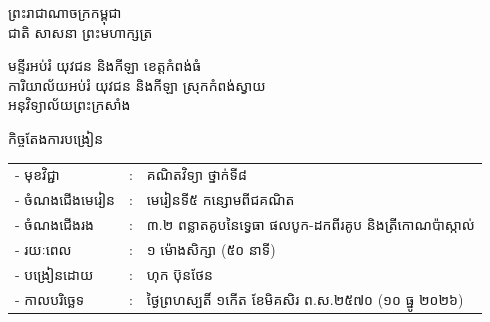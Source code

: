 \documentclass[a4paper,10pt]{article}
\newcommand{\khmflourish}{{\Tacteing\fontsize{36pt}{14pt}\selectfont\raisebox{-5pt}{3}}}
\begin{document}
\fontsize{10pt}{15.2pt}\selectfont

\begin{center}
  {\muol\fontsize{11pt}{16pt}\selectfont ព្រះរាជាណាចក្រកម្ពុជា}\\[2pt]
  {\muol\fontsize{10pt}{15pt}\selectfont ជាតិ សាសនា ព្រះមហាក្សត្រ}\\[1pt]
  \khmflourish
\end{center}

\vspace{-28pt}
{\muol\fontsize{9.5pt}{12.5pt}\selectfont
មន្ទីរអប់រំ យុវជន និងកីឡា ខេត្តកំពង់ធំ\\
ការិយាល័យអប់រំ យុវជន និងកីឡា ស្រុកកំពង់ស្វាយ\\
អនុវិទ្យាល័យព្រះក្រសាំង}

\vspace{1pt}
\begin{center}
  {\muol\fontsize{10pt}{14pt}\selectfont កិច្ចតែងការបង្រៀន}
\end{center}
\vspace{0pt}

{\renewcommand{\arraystretch}{0.95}
\hspace*{4.05cm}%
\begin{tabular}{@{}l l l@{}}
  - \hspace{0.35cm} មុខវិជ្ជា & : & គណិតវិទ្យា ថ្នាក់ទី៨ \\
  - \hspace{0.35cm} ចំណងជើងមេរៀន & : & មេរៀនទី៥ កន្សោមពីជគណិត \\
  - \hspace{0.35cm} ចំណងជើងរង & : & ៣.២ ពន្លាតគូបនៃទ្វេធា ផលបូក-ដកពីរគូប និងត្រីកោណប៉ាស្កាល់ \\
  - \hspace{0.35cm} រយៈពេល & : & ១ ម៉ោងសិក្សា (៥០ នាទី) \\
  - \hspace{0.35cm} បង្រៀនដោយ & : & ហុក ប៊ុនថែន \\
  - \hspace{0.35cm} កាលបរិច្ឆេទ & : & ថ្ងៃព្រហស្បតិ៍ ១កើត ខែមិគសិរ ព.ស.២៥៧០ (១០ ធ្នូ ២០២៦) \\
\end{tabular}
}

\vspace{1pt}
\end{document}
